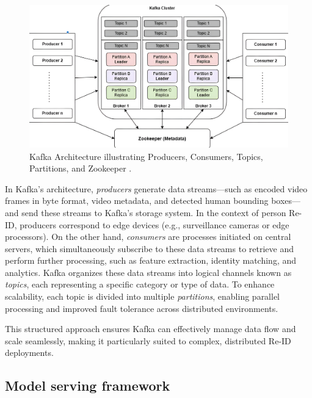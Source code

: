 \documentclass[../main.tex]{subfiles}
\begin{document}
\begin{figure}[htbp]
    \centering
    \includegraphics[width=1\textwidth]{Figure/kafka-fig.png}
    \caption{Kafka Architecture illustrating Producers, Consumers, Topics, Partitions, and Zookeeper \cite{whatiskafka}.}
    \label{fig:kafka_architecture}
\end{figure}

In Kafka's architecture, \textit{producers} generate data streams—such as encoded video frames in byte format, video metadata, and detected human bounding boxes—and send these streams to Kafka's storage system. In the context of person Re-ID, producers correspond to edge devices (e.g., surveillance cameras or edge processors). On the other hand, \textit{consumers} are processes initiated on central servers, which simultaneously subscribe to these data streams to retrieve and perform further processing, such as feature extraction, identity matching, and analytics. Kafka organizes these data streams into logical channels known as \textit{topics}, each representing a specific category or type of data. To enhance scalability, each topic is divided into multiple \textit{partitions}, enabling parallel processing and improved fault tolerance across distributed environments. 

This structured approach ensures Kafka can effectively manage data flow and scale seamlessly, making it particularly suited to complex, distributed Re-ID deployments.

\subsection{Model serving framework}
\label{sec:model_serving_framework}
\end{document}
